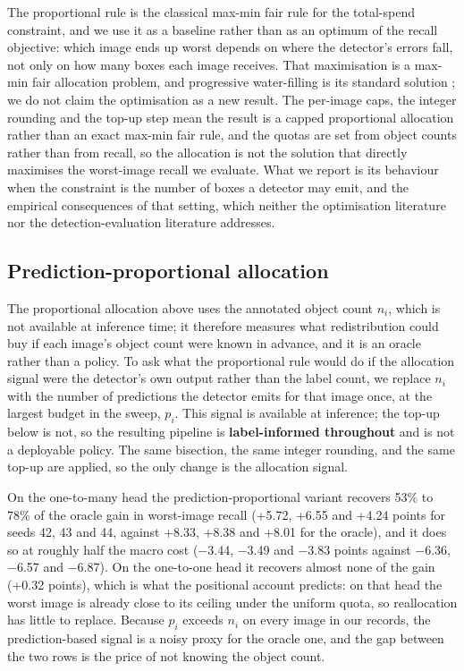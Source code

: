 \documentclass[sn-mathphys,Numbered]{sn-jnl}
\begin{document}
The proportional rule is the classical max-min fair rule for the total-spend constraint, and we use it as a baseline rather than as an optimum of the recall objective: which image ends up worst depends on where the detector's errors fall, not only on how many boxes each image receives. That maximisation is a max-min fair allocation problem, and progressive water-filling is its standard solution \cite{bertsekas1992data}; we do not claim the optimisation as a new result. The per-image caps, the integer rounding and the top-up step mean the result is a capped proportional allocation rather than an exact max-min fair rule, and the quotas are set from object counts rather than from recall, so the allocation is not the solution that directly maximises the worst-image recall we evaluate. What we report is its behaviour when the constraint is the number of boxes a detector may emit, and the empirical consequences of that setting, which neither the optimisation literature nor the detection-evaluation literature addresses.

\subsection{Prediction-proportional allocation}

The proportional allocation above uses the annotated object count $n_i$, which is not available at inference time; it therefore measures what redistribution could buy if each image's object count were known in advance, and it is an oracle rather than a policy. To ask what the proportional rule would do if the allocation signal were the detector's own output rather than the label count, we replace $n_i$ with the number of predictions the detector emits for that image once, at the largest budget in the sweep, $p_i$. This signal is available at inference; the top-up below is not, so the resulting pipeline is \textbf{label-informed throughout} and is not a deployable policy. The same bisection, the same integer rounding, and the same top-up are applied, so the only change is the allocation signal.

On the one-to-many head the prediction-proportional variant recovers 53\% to 78\% of the oracle gain in worst-image recall (+5.72, +6.55 and +4.24 points for seeds 42, 43 and 44, against +8.33, +8.38 and +8.01 for the oracle), and it does so at roughly half the macro cost ($-$3.44, $-$3.49 and $-$3.83 points against $-$6.36, $-$6.57 and $-$6.87). On the one-to-one head it recovers almost none of the gain (+0.32 points), which is what the positional account predicts: on that head the worst image is already close to its ceiling under the uniform quota, so reallocation has little to replace. Because $p_i$ exceeds $n_i$ on every image in our records, the prediction-based signal is a noisy proxy for the oracle one, and the gap between the two rows is the price of not knowing the object count.
\end{document}
